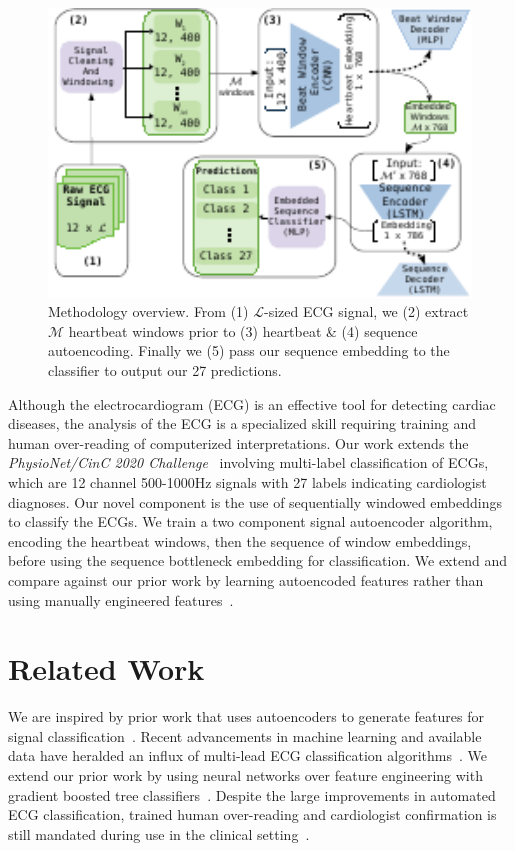 \documentclass[\main/thesis.tex]{subfiles}
\begin{document}
\begin{figure}[t]
    \centering
    \includegraphics[width=12cm]{figure/aenc_methodology.pdf}
    \caption{Methodology overview. From (1) $\mathcal{L}$-sized ECG signal, we (2) extract $\mathcal{M}$ heartbeat windows prior to (3) heartbeat \& (4) sequence autoencoding. Finally we (5) pass our sequence embedding to the classifier to output our 27 predictions.}
    \label{fig:aenc_methodology}
\end{figure}

Although the electrocardiogram (ECG) is an effective tool for detecting cardiac diseases, the analysis of the ECG is a specialized skill requiring training and human over-reading of computerized interpretations.
Our work extends the \emph{PhysioNet/CinC 2020 Challenge}~\cite{physionet_challenge_2020} involving multi-label classification of ECGs, which are 12 channel 500-1000Hz signals with 27 labels indicating cardiologist diagnoses.
Our novel component is the use of sequentially windowed embeddings to classify the ECGs.
We train a two component signal autoencoder algorithm, encoding the heartbeat windows, then the sequence of window embeddings, before using the sequence bottleneck embedding for classification.
We extend and compare against our prior work by learning autoencoded features rather than using manually engineered features~\cite{wong2020CINC-multilabel-ECG}.

\section{Related Work}

We are inspired by prior work that uses autoencoders to generate features for signal classification~\cite{8688435,7752836}.
Recent advancements in machine learning and available data have heralded an influx of multi-lead ECG classification algorithms~\cite{ribeiro2020,CHEN2020100886,9206538,BALOGLU201923,8846016,wong2020CINC-multilabel-ECG}.
We extend our prior work by using neural networks over feature engineering with gradient boosted tree classifiers~\cite{wong2020CINC-multilabel-ECG}.
Despite the large improvements in automated ECG classification, trained human over-reading and cardiologist confirmation is still mandated during use in the clinical setting~\cite{SMITH201988,MADIAS2018413}.
\end{document}
